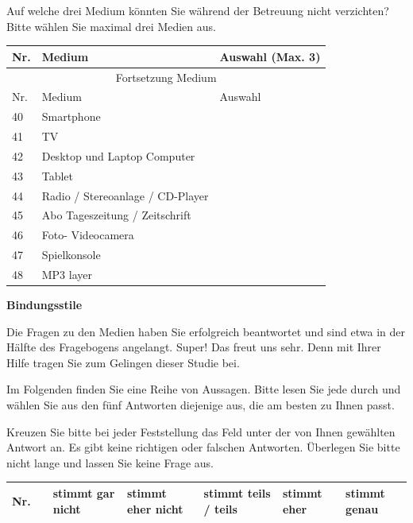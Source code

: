 \begin{flushleft}
Auf welche drei Medium könnten Sie während der Betreuung nicht verzichten? Bitte wählen Sie maximal drei Medien aus.

\begin{longtable}[c]{ |p{1em}|p{18em}|p{10em}|} 
  \hline
  Nr. & Medium & Auswahl (Max. 3) \\
  \hline
  \endfirsthead
 
  \hline
  \multicolumn{3}{|c|}{ Fortsetzung Medium}\\
  \hline
    Nr. & Medium & Auswahl \\
  \hline
  \endhead
 
  \hline
  \endfoot
 
  \hline\hline
  \endlastfoot
  
  
  40 & Smartphone & \\
  41 & TV &\\
  42 & Desktop und Laptop Computer &\\
  43 & Tablet &\\
  44 & Radio / Stereoanlage / CD-Player &\\
  45 & Abo Tageszeitung / Zeitschrift &\\
  46 & Foto- Videocamera &\\
  47 & Spielkonsole &\\
  48 & MP3 layer &\\
\end{longtable}

\textbf{Bindungsstile}

Die Fragen zu den Medien haben Sie erfolgreich beantwortet und sind etwa in der Hälfte des Fragebogens angelangt. Super! Das freut uns sehr. Denn mit Ihrer Hilfe tragen Sie zum Gelingen dieser Studie bei.

\vspace{2mm}
Im Folgenden finden Sie eine Reihe von Aussagen. Bitte lesen Sie jede durch und wählen Sie aus den fünf Antworten diejenige aus, die am besten zu Ihnen passt.

\vspace{2mm}
Kreuzen Sie bitte bei jeder Feststellung das Feld unter der von Ihnen gewählten Antwort an. Es gibt keine richtigen oder falschen Antworten. Überlegen Sie bitte nicht lange und lassen Sie keine Frage aus.

\begin{longtable}[c]{ |p{1em}|p{14em}|p{3em}|p{3em}|p{3em}|p{3em}|p{3em}|} 
  \hline
  Nr. & & stimmt gar nicht & stimmt eher nicht & stimmt teils / teils & stimmt eher & stimmt genau \\
  \hline
  \endfirsthead
 

\end{longtable}
\end{flushleft}
